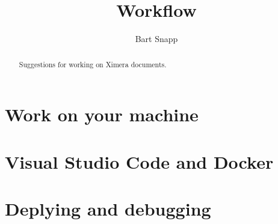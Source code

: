 \documentclass{ximera}
\title{Workflow}
\author{Bart Snapp}
\begin{document}
\begin{abstract}
    Suggestions for working on Ximera documents.
\end{abstract}
\maketitle

\section{Work on your machine}



\section{Visual Studio Code and Docker}

\section{Deplying and debugging}
\end{document}
